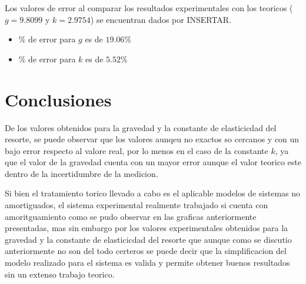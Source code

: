 \documentclass[10pt]{article}
\begin{document}
        Los valores de error al comparar los resultados experimentales con los teoricos ($g = 9.8099$ y $k=2.9754$) se encuentran dados por INSERTAR.

        \begin{itemize}
            \item \% de error para $g$ es de $19.06\%$
            \item \% de error para $k$ es de $5.52\%$
        \end{itemize}

    \section{Conclusiones}
        De los valores obtenidos para la gravedad y la constante de elasticicdad del resorte, se puede observar que los valores aunqeu no exactos so cercanos y con un bajo error respecto al valore real, por lo menos en el caso de la constante $k$, ya que el valor de la gravedad cuenta con un mayor error aunque el valor teorico este dentro de la incertidumbre de la medicion.

        Si bien el tratamiento torico llevado a cabo es el aplicable modelos de sistemas no amortiguados, el sistema experimental realmente trabajado si cuenta con amoritguamiento como se pudo observar en las graficas anteriormente presentadas, mas sin embargo por los valores experimentales obtenidos para la gravedad y la constante de elasticicdad del resorte que aunque como se discutio anteriormente no son del todo certeros se puede decir que la simplificacion del modelo realizado para el sistema es valida y permite obtener buenos resultados sin un extenso trabajo teorico.
\end{document}
